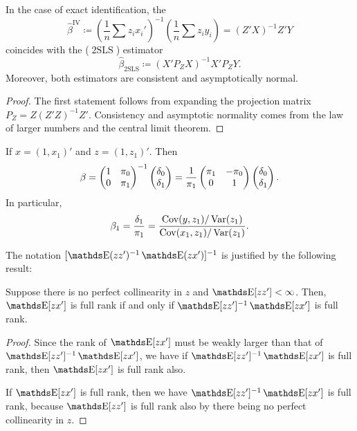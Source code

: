 \documentclass[letterpaper, 10pt]{article}
\DeclareMathOperator{\IV}{IV}
\DeclareMathOperator{\TSLS}{2SLS}
\begin{document}
\begin{proposition}
  In the case of exact identification, the 
  \[
    \hat{\beta}^{\IV}
    \coloneqq \left( \frac{1}{n} \sum z_i x_i' \right)^{-1} \left( \frac{1}{n} \sum z_i y_i \right)
    = (Z'X)^{-1} Z'Y
  \]
  coincides with the  (\(\TSLS\)) estimator
  \[
    \hat{\beta}_{\TSLS}
    \coloneqq (X' P_Z X)^{-1} X' P_Z Y.
  \]
  Moreover, both estimators are consistent and asymptotically normal.
\end{proposition}
\begin{proof}
  The first statement follows from expanding the projection matrix \(P_Z = Z(Z'Z)^{-1}Z'\).
  Consistency and asymptotic normality comes from the law of larger numbers and the central limit theorem.
\end{proof}


\begin{example}
  If \(x = (1, x_1)'\) and \(z = (1, z_1)'\).
  Then
  \[
    \beta = \begin{pmatrix}
      1 & \pi_0 \\
      0 & \pi_1
    \end{pmatrix}^{-1} \begin{pmatrix}
      \delta_0 \\
      \delta_1
    \end{pmatrix}
    = \frac{1}{\pi_1} \begin{pmatrix}
      \pi_1 & -\pi_0 \\
      0 & 1
    \end{pmatrix} \begin{pmatrix}
      \delta_0 \\
      \delta_1
    \end{pmatrix}.
  \]
  In particular,
  \[
    \beta_1 = \frac{\delta_1}{\pi_1}
    = \frac{\operatorname{Cov}(y, z_1) / \operatorname{Var}(z_1)}{\operatorname{Cov}(x_1, z_1) / \operatorname{Var}(z_1)}.
  \]
\end{example}


The notation \([\E(zz')^{-1} \E(zx')]^{-1}\) is justified by the following result:
\begin{proposition}
  Suppose there is no perfect collinearity in \(z\) and \(\E[zz'] < \infty\).
  Then, \(\E[zx']\) is full rank if and only if \(\E[zz']^{-1} \E[zx']\) is full rank.
\end{proposition}
\begin{proof}
  Since the rank of \(\E[zx']\) must be weakly larger than that of \(\E[zz']^{-1} \E[zx']\), we have if \(\E[zz']^{-1} \E[zx']\) is full rank, then \(\E[zx']\) is full rank also.

  If \(\E[zx']\) is full rank, then we have \(\E[zz']^{-1} \E[zx']\) is full rank, because \(\E[zz']\) is full rank also by there being no perfect collinearity in \(z\).
\end{proof}
\end{document}
